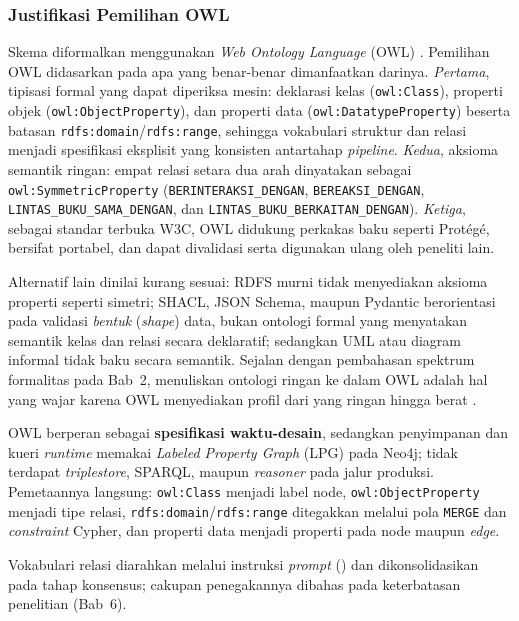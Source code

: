 \documentclass[../../thesis]{subfiles}
\begin{document}


\subsubsection{Justifikasi Pemilihan OWL}

Skema diformalkan menggunakan \textit{Web Ontology Language} (OWL)
\parencite{w3c_owl2_2012}. Pemilihan OWL didasarkan pada apa yang
benar-benar dimanfaatkan darinya. \emph{Pertama}, tipisasi formal yang dapat
diperiksa mesin: deklarasi kelas (\texttt{owl:Class}), properti objek
(\texttt{owl:ObjectProperty}), dan properti data
(\texttt{owl:DatatypeProperty}) beserta batasan
\texttt{rdfs:domain}/\texttt{rdfs:range}, sehingga vokabulari struktur dan
relasi menjadi spesifikasi eksplisit yang konsisten antartahap
\textit{pipeline}. \emph{Kedua}, aksioma semantik ringan: empat relasi setara dua arah
dinyatakan sebagai \texttt{owl:SymmetricProperty}
(\texttt{BERINTERAKSI\_DENGAN}, \texttt{BEREAKSI\_DENGAN},
\texttt{LINTAS\_BUKU\_SAMA\_DENGAN}, dan
\texttt{LINTAS\_BUKU\_BERKAITAN\_DENGAN}). \emph{Ketiga}, sebagai standar terbuka
W3C, OWL didukung perkakas baku seperti Prot\'eg\'e, bersifat portabel, dan
dapat divalidasi serta digunakan ulang oleh peneliti lain.

Alternatif lain dinilai kurang sesuai: RDFS murni tidak menyediakan aksioma
properti seperti simetri; SHACL, JSON Schema, maupun Pydantic berorientasi pada
validasi \textit{bentuk} (\textit{shape}) data, bukan ontologi formal yang
menyatakan semantik kelas dan relasi secara deklaratif; sedangkan UML atau
diagram informal tidak baku secara semantik. Sejalan dengan pembahasan spektrum
formalitas pada Bab~2, menuliskan ontologi
ringan ke dalam OWL adalah hal yang wajar karena OWL menyediakan profil dari
yang ringan hingga berat \parencite{w3c_owl2_profiles_2012}.

OWL berperan sebagai \textbf{spesifikasi waktu-desain}, sedangkan penyimpanan
dan kueri \textit{runtime} memakai \textit{Labeled Property Graph} (LPG) pada
Neo4j; tidak terdapat \textit{triplestore}, SPARQL, maupun \textit{reasoner}
pada jalur produksi. Pemetaannya langsung: \texttt{owl:Class} menjadi label
node, \texttt{owl:ObjectProperty} menjadi tipe relasi,
\texttt{rdfs:domain}/\texttt{rdfs:range} ditegakkan melalui pola \texttt{MERGE}
dan \textit{constraint} Cypher, dan properti data menjadi properti pada node
maupun \textit{edge}.

Vokabulari relasi diarahkan melalui instruksi \textit{prompt}
() dan dikonsolidasikan pada tahap
konsensus; cakupan penegakannya dibahas pada keterbatasan penelitian (Bab~6).
\end{document}
